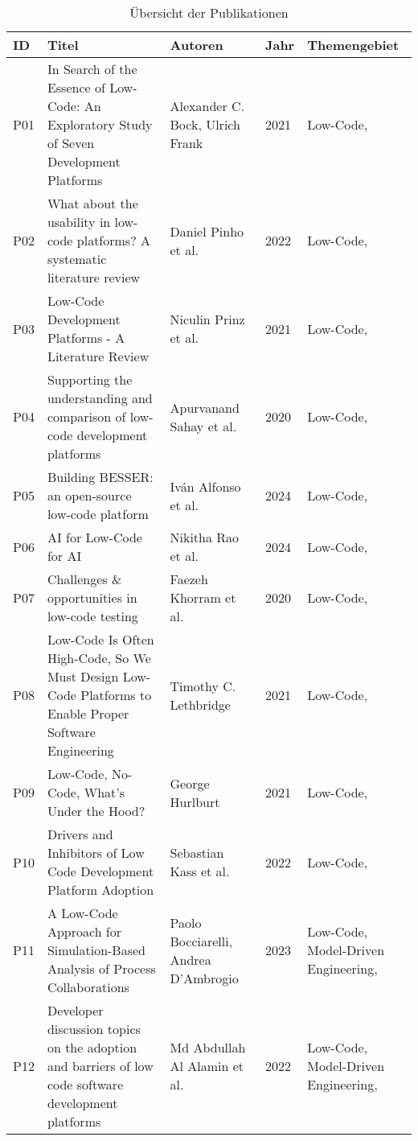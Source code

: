 \begin{longtable}{|m{0.8cm}|m{4.4cm}|m{3cm}|m{0.8cm}|m{4cm}|}
    \caption{Übersicht der Publikationen} 
    \label{tab:publikationen} \\
    \hline
    \textbf{ID} & \textbf{Titel} & \textbf{Autoren} & \textbf{Jahr} & \textbf{Themengebiet} \\
    \hline
    \endhead
    P01 & In Search of the Essence of Low-Code: An Exploratory Study of Seven Development Platforms & Alexander C. Bock, Ulrich Frank~\cite{Bock_2021_essence} & 2021 & Low-Code,  \\ \hline
    P02 & What about the usability in low-code platforms? A systematic literature review & Daniel Pinho et al.~\cite{Pinho_2022} & 2022 & Low-Code,  \\ \hline
    P03 & Low-Code Development Platforms - A Literature Review & Niculin Prinz et al.~\cite{Prinz_2021} & 2021 & Low-Code,  \\ \hline
    P04 & Supporting the understanding and comparison of low-code development platforms & Apurvanand Sahay et al.~\cite{Sahay_2020} & 2020 & Low-Code,  \\ \hline
    P05 & Building BESSER: an open-source low-code platform & Iván Alfonso et al.~\cite{alfonso2024building} & 2024 & Low-Code,  \\ \hline
    P06 & AI for Low-Code for AI & Nikitha Rao et al.~\cite{rao2024} & 2024 & Low-Code,  \\ \hline
    P07 & Challenges \& opportunities in low-code testing & Faezeh Khorram et al.~\cite{Khorram_2020} & 2020 & Low-Code,  \\ \hline
    P08 & Low-Code Is Often High-Code, So We Must Design Low-Code Platforms to Enable Proper Software Engineering & Timothy C. Lethbridge~\cite{lethbridge2021low} & 2021 & Low-Code,  \\ \hline
    P09 & Low-Code, No-Code, What's Under the Hood? & George Hurlburt~\cite{Hurlburt_2021} & 2021 & Low-Code,  \\ \hline
    P10 & Drivers and Inhibitors of Low Code Development Platform Adoption & Sebastian Kass et al.~\cite{Kass_2022} & 2022 & Low-Code,  \\ \hline
    P11 & A Low-Code Approach for Simulation-Based Analysis of Process Collaborations & Paolo Bocciarelli, Andrea D'Ambrogio~\cite{Bocciarelli_2023} & 2023 & Low-Code, Model-Driven Engineering,  \\ \hline
    P12 & Developer discussion topics on the adoption and barriers of low code software development platforms & Md Abdullah Al Alamin et al.~\cite{Alamin_2022} & 2022 & Low-Code, Model-Driven Engineering,  \\ \hline

\end{longtable}
